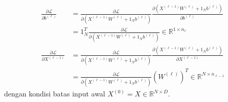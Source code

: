 \documentclass[11pt,a4paper]{article}
\def\mathbf#1{#1}%
\theoremstyle{plain}
\theoremstyle{definition}
\theoremstyle{remark}
\begin{document}
\begin{align}
    \frac{\partial \mathcal{L}}{\partial \mathbf{b}^{(\ell)}} &= \frac{\partial \mathcal{L}}{\partial \left( X^{(\ell-1)} W^{(\ell)} + \mathbf{1}_N \mathbf{b}^{(\ell)} \right)} \frac{\partial \left( X^{(\ell-1)} W^{(\ell)} + \mathbf{1}_N \mathbf{b}^{(\ell)} \right)}{\partial \mathbf{b}^{(\ell)}} \nonumber \\
    &= \mathbf{1}_N^T \frac{\partial \mathcal{L}}{\partial \left( X^{(\ell-1)} W^{(\ell)} + \mathbf{1}_N \mathbf{b}^{(\ell)} \right)} \in \mathbb{R}^{1 \times n_\ell} \label{eq:reparam_dL_db_hidden} \\[0.2em]
    \frac{\partial \mathcal{L}}{\partial X^{(\ell-1)}} &= \frac{\partial \mathcal{L}}{\partial \left( X^{(\ell-1)} W^{(\ell)} + \mathbf{1}_N \mathbf{b}^{(\ell)} \right)} \frac{\partial \left( X^{(\ell-1)} W^{(\ell)} + \mathbf{1}_N \mathbf{b}^{(\ell)} \right)}{\partial X^{(\ell-1)}} \nonumber \\
    &= \frac{\partial \mathcal{L}}{\partial \left( X^{(\ell-1)} W^{(\ell)} + \mathbf{1}_N \mathbf{b}^{(\ell)} \right)} \left( W^{(\ell)} \right)^T \in \mathbb{R}^{N \times n_{\ell-1}} \label{eq:reparam_dL_dXprev_hidden}
\end{align}
dengan kondisi batas input awal $X^{(0)} = X \in \mathbb{R}^{N \times D}$.
\end{document}
